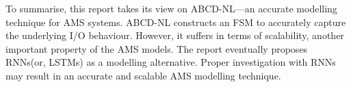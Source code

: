 \documentclass[a4paper]{article}
\begin{document}


To summarise, this report takes its view on ABCD-NL---an accurate modelling technique for AMS systems. ABCD-NL constructs an FSM to accurately capture the underlying I/O behaviour. However, it suffers in terms of scalability, another important property of the AMS models. The report eventually proposes RNNs(or, LSTMs) as a modelling alternative. Proper investigation with RNNs may result in an accurate and scalable AMS modelling technique.  





 

\end{document}
